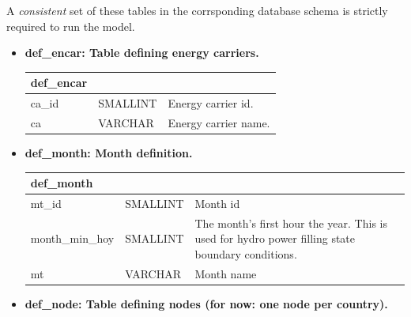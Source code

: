 \documentclass[]{article}
\begin{document}
A \emph{consistent} set of these tables in the corrsponding database
schema is strictly required to run the model.

\begin{itemize}
\item
\textbf{def\_encar: Table defining energy carriers.}

\begin{tabular}{@{}llp{10cm}@{}}
\toprule
def\_encar & & \\
\midrule
ca\_id 	& SMALLINT 		& Energy carrier id. \\
ca 		& VARCHAR	 & Energy carrier name. \\
\bottomrule
\end{tabular}

\item \textbf{def\_month: Month definition.}\\
\begin{tabular}{@{}llp{10cm}@{}}
\toprule
def\_month			&			&	\\
\midrule
mt\_id 				& SMALLINT 	& Month id\\
month\_min\_hoy 	& SMALLINT 	& The month's first hour the year. This is used for hydro power filling state boundary conditions. \\
mt & VARCHAR & Month name\\
\bottomrule
\end{tabular}

\item \textbf{def\_node: Table defining nodes (for now: one node per
country).}


\end{itemize}
\end{document}
